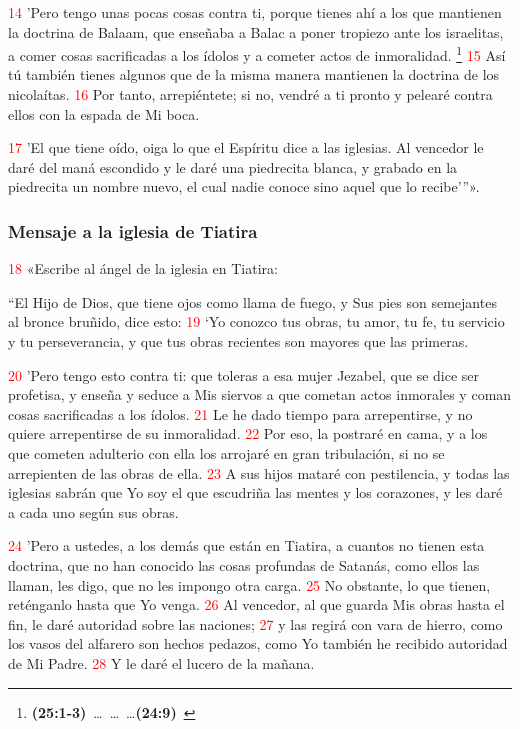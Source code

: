 \documentclass[12pt,twocolumn,twoside]{book}
\newcommand{\cbibleref}[3]{\textbf{\ibibleverse[textit]{#1}(#2)}\ {#3}}
\newcommand{\cbiblechvs}[3]{\textbf{\ibiblechvs[textit]{#1}{#2}}\ {#3}}
\newcommand{\vnum}[1]{\textcolor{red}{\normalsize{#1}}}
\begin{document}
\vnum{14} ’Pero tengo unas pocas cosas contra ti, porque tienes ahí a los que mantienen la doctrina de Balaam, que enseñaba a Balac a poner tropiezo ante los israelitas, a comer cosas sacrificadas a los ídolos y a cometer actos de inmoralidad.%
	\footnote{\cbibleref{Numbers}{25:1-3}{}\ldots \cbiblechvs{Numbers}{31:8}{}\ldots \cbiblechvs{Numbers}{31:16}{}\ldots \cbibleref{Joshua}{24:9}{}}
\vnum{15} Así tú también tienes algunos que de la misma manera mantienen la doctrina de los nicolaítas. %
\vnum{16} Por tanto, arrepiéntete; si no, vendré a ti pronto y pelearé contra ellos con la espada de Mi boca.

\vnum{17} ’El que tiene oído, oiga lo que el Espíritu dice a las iglesias. Al vencedor le daré del maná escondido y le daré una piedrecita blanca, y grabado en la piedrecita un nombre nuevo, el cual nadie conoce sino aquel que lo recibe’”».
\subsubsection*{Mensaje a la iglesia de Tiatira}
\vnum{18} «Escribe al ángel de la iglesia en Tiatira:

“El Hijo de Dios, que tiene ojos como llama de fuego, y Sus pies son semejantes al bronce bruñido, dice esto: %
\vnum{19} ‘Yo conozco tus obras, tu amor, tu fe, tu servicio y tu perseverancia, y que tus obras recientes son mayores que las primeras.

\vnum{20} ’Pero tengo esto contra ti: que toleras a esa mujer Jezabel, que se dice ser profetisa, y enseña y seduce a Mis siervos a que cometan actos inmorales y coman cosas sacrificadas a los ídolos. %
\vnum{21} Le he dado tiempo para arrepentirse, y no quiere arrepentirse de su inmoralidad. %
\vnum{22} Por eso, la postraré en cama, y a los que cometen adulterio con ella los arrojaré en gran tribulación, si no se arrepienten de las obras de ella. %
\vnum{23} A sus hijos mataré con pestilencia, y todas las iglesias sabrán que Yo soy el que escudriña las mentes y los corazones, y les daré a cada uno según sus obras.

\vnum{24} ’Pero a ustedes, a los demás que están en Tiatira, a cuantos no tienen esta doctrina, que no han conocido las cosas profundas de Satanás, como ellos las llaman, les digo, que no les impongo otra carga. %
\vnum{25} No obstante, lo que tienen, reténganlo hasta que Yo venga. %
\vnum{26} Al vencedor, al que guarda Mis obras hasta el fin, le daré autoridad sobre las naciones; %
\vnum{27} y las regirá con vara de hierro, como los vasos del alfarero son hechos pedazos, como Yo también he recibido autoridad de Mi Padre. %
\vnum{28} Y le daré el lucero de la mañana.
\end{document}
